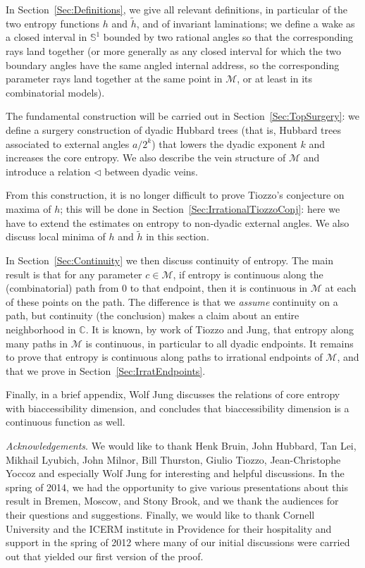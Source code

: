 \documentclass[12pt]{amsart}
\newcommand{\M}{\mathscr M}
\newcommand{\C}{\mathbb C}
\newcommand{\Circle}{\mathbb S^1}
\newcommand{\0}{\texttt{0}}
\newcommand{\1}{\texttt{1}}
\theoremstyle{definition}
\numberwithin{equation}{section}
\begin{document}
In Section~\ref{Sec:Definitions}, we give all relevant definitions, in particular of the two entropy functions $h$ and $\tilde h$, and of invariant laminations; we define a wake as a closed interval in $\Circle$ bounded by two rational angles so that the corresponding rays land together (or more generally as any closed interval for which the two boundary angles have the same angled internal address, so the corresponding parameter rays land together at the same point in $\M$, or at least in its combinatorial models).

The fundamental construction will be carried out in Section~\ref{Sec:TopSurgery}: we define a surgery construction of dyadic Hubbard trees (that is, Hubbard trees associated to external angles $a/2^k$) that lowers the dyadic exponent $k$  and increases the core entropy. We also describe the vein structure of $\M$ and introduce a relation $\lhd$ between dyadic veins.

From this construction, it is no longer difficult to prove Tiozzo's conjecture on maxima of $h$; this will be done in Section~\ref{Sec:IrrationalTiozzoConj}: here we have to extend the estimates on entropy to non-dyadic external angles. We also discuss local minima of $h$ and $\tilde h$ in this section.

In Section~\ref{Sec:Continuity} we then discuss continuity of entropy. The main result is that for any parameter $c\in\M$, if entropy is continuous along the (combinatorial) path from $0$ to that endpoint, then it is continuous in $\M$ at each of these points on the path. The difference is that we \emph{assume} continuity on a path, but continuity (the conclusion) makes a claim about an entire neighborhood in $\C$. It is known, by work of Tiozzo and Jung, that entropy along many paths in $\M$ is continuous, in particular to all dyadic endpoints. It remains to prove that entropy is continuous along paths to irrational endpoints of $\M$, and that we prove in Section~\ref{Sec:IrratEndpoints}. 

Finally, in a brief appendix, Wolf Jung discusses the relations of core entropy with biaccessibility dimension, and concludes that biaccessibility dimension is a continuous function as well.


\emph{Acknowledgements}. We would like to thank Henk Bruin, John Hubbard, Tan Lei, Mikhail Lyubich, John Milnor, Bill Thurston, Giulio Tiozzo, Jean-Christophe Yoccoz and especially Wolf Jung for interesting and helpful discussions. In the spring of 2014, we had the opportunity to give various presentations about this result in Bremen, Moscow, and Stony Brook, and we thank the audiences for their questions and suggestions.
Finally, we would like to thank Cornell University and the ICERM institute in Providence for their hospitality and support in the spring of 2012 where many of our initial discussions were carried out that yielded our first version of the proof.
\goodbreak
\end{document}
